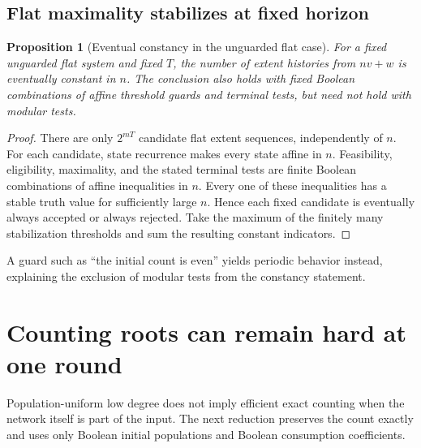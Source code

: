 \documentclass[11pt,letterpaper]{article}
\newtheorem{proposition}[theorem]{Proposition}
\theoremstyle{definition}
\theoremstyle{remark}
\begin{document}
\subsection{Flat maximality stabilizes at fixed horizon}
\begin{proposition}[Eventual constancy in the unguarded flat case]\label{qoc:mp:prop:flatconstant}
For a fixed unguarded flat system and fixed $T$, the number of extent
histories from $nv+w$ is eventually constant in $n$. The conclusion also
holds with fixed Boolean combinations of affine threshold guards and
terminal tests, but need not hold with modular tests.
\end{proposition}
\begin{proof}
There are only $2^{mT}$ candidate flat extent sequences, independently of
$n$. For each candidate, state recurrence makes every state affine in
$n$. Feasibility, eligibility, maximality, and the stated terminal tests
are finite Boolean combinations of affine inequalities in $n$. Every
one of these inequalities has a stable truth value for sufficiently large
$n$. Hence each fixed candidate is eventually always accepted or always
rejected. Take the maximum of the finitely many stabilization thresholds
and sum the resulting constant indicators.
\end{proof}
A guard such as ``the initial count is even'' yields periodic behavior
instead, explaining the exclusion of modular tests from the constancy
statement.

\section{Counting roots can remain hard at one round}\label{qoc:mp:sec:countinghard}
Population-uniform low degree does not imply efficient exact counting when
the network itself is part of the input. The next reduction preserves the
count exactly and uses only Boolean initial populations and Boolean
consumption coefficients.
\end{document}

